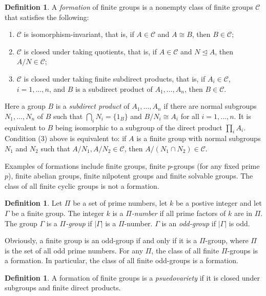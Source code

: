 \documentclass[11pt]{amsart}
\theoremstyle{definition}
\newtheorem{definition}[theorem]{Definition}
\theoremstyle{definition}
\numberwithin{equation}{section}
\begin{document}
\begin{definition}\label{def:formation} A {\em formation} of finite groups is a nonempty class of finite groups $\mathcal{C}$ that satisfies the following:
\begin{enumerate}
\item[(1)] $\mathcal{C}$ is isomorphism-invariant, that is, if $A\in \mathcal{C}$ and $A\cong B$, then $B\in\mathcal{C}$;
\item[(2)] $\mathcal{C}$ is closed under taking quotients, that is, if $A\in\mathcal{C}$ and $N\unlhd A$, then $A/N\in\mathcal{C}$;
\item[(3)] $\mathcal{C}$ is closed under taking finite subdirect products, that is, if $A_i\in \mathcal{C}$, $i=1,\dots, n$, and $B$ is a subdirect product of $A_1,\dots, A_n$, then $B\in \mathcal{C}$.
\end{enumerate}
\end{definition}

Here a group $B$ is a {\em subdirect product} of $A_1, \dots, A_n$ if there are normal subgroups $N_1,\dots, N_n$ of $B$ such that $\bigcap_i N_i=\{1_B\}$ and $B/N_i\cong A_i$ for all $i=1,\dots, n$. It is equivalent to $B$ being isomorphic to a subgroup of the direct product $\prod_i A_i$. Condition (3) above is equivalent to: if $A$ is a finite group with normal subgroups $N_1$ and $N_2$ such that $A/N_1, A/N_2\in\mathcal{C}$, then $A/(N_1\cap N_2)\in\mathcal{C}$. 

Examples of formations include finite groups, finite $p$-groups (for any fixed prime $p$), finite abelian groups, finite nilpotent groups and finite solvable groups. The class of all finite cyclic groups is not a formation. 

\begin{definition} Let $\Pi$ be a set of prime numbers, let $k$ be a postive integer and let $\Gamma$ be a finite group. The integer $k$ is a {\em $\Pi$-number} if all prime factors of $k$ are in $\Pi$. The group $\Gamma$ is a {\em $\Pi$-group} if $|\Gamma|$ is a $\Pi$-number. $\Gamma$ is an {\em odd-group} if $|\Gamma|$ is odd.
\end{definition}

Obviously, a finite group is an odd-group if and only if it is a $\Pi$-group, where $\Pi$ is the set of all odd prime numbers. For any $\Pi$, the class of all finite $\Pi$-groups is a formation. In particular, the class of all finite odd-groups is a formation.

\begin{definition} A formation of finite groups is a {\em psuedovariety} if it is closed under subgroups and finite direct products.
\end{definition}
\end{document}
